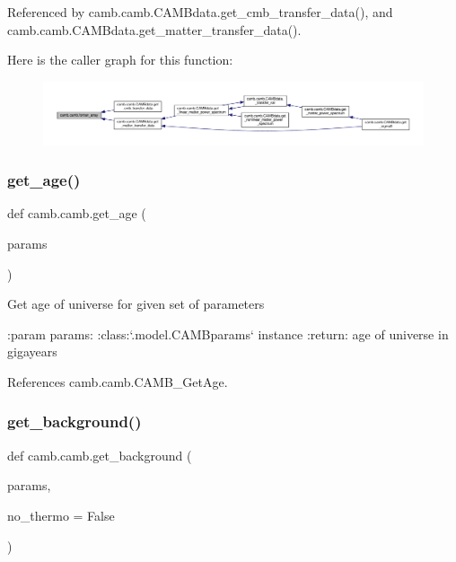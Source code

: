 Referenced by camb.\+camb.\+C\+A\+M\+Bdata.\+get\+\_\+cmb\+\_\+transfer\+\_\+data(), and camb.\+camb.\+C\+A\+M\+Bdata.\+get\+\_\+matter\+\_\+transfer\+\_\+data().

Here is the caller graph for this function\+:
\nopagebreak
\begin{figure}[H]
\begin{center}
\leavevmode
\includegraphics[width=350pt]{namespacecamb_1_1camb_aa47148183bb7f90330a1e2f01b1063ff_icgraph}
\end{center}
\end{figure}
\mbox{\label{namespacecamb_1_1camb_af6991964b3a277d691e0197b9d715c11}} 
\subsubsection{\texorpdfstring{get\+\_\+age()}{get\_age()}}
{\footnotesize\ttfamily def camb.\+camb.\+get\+\_\+age (\begin{DoxyParamCaption}\item[{}]{params }\end{DoxyParamCaption})}

\begin{DoxyVerb}Get age of universe for given set of parameters

:param params:  :class:`.model.CAMBparams` instance
:return: age of universe in gigayears
\end{DoxyVerb}
 

References camb.\+camb.\+C\+A\+M\+B\+\_\+\+Get\+Age.

\mbox{\label{namespacecamb_1_1camb_af70bd70f702022b4caa64e9891b30435}} 
\subsubsection{\texorpdfstring{get\+\_\+background()}{get\_background()}}
{\footnotesize\ttfamily def camb.\+camb.\+get\+\_\+background (\begin{DoxyParamCaption}\item[{}]{params,  }\item[{}]{no\+\_\+thermo = {\ttfamily False} }\end{DoxyParamCaption})}

